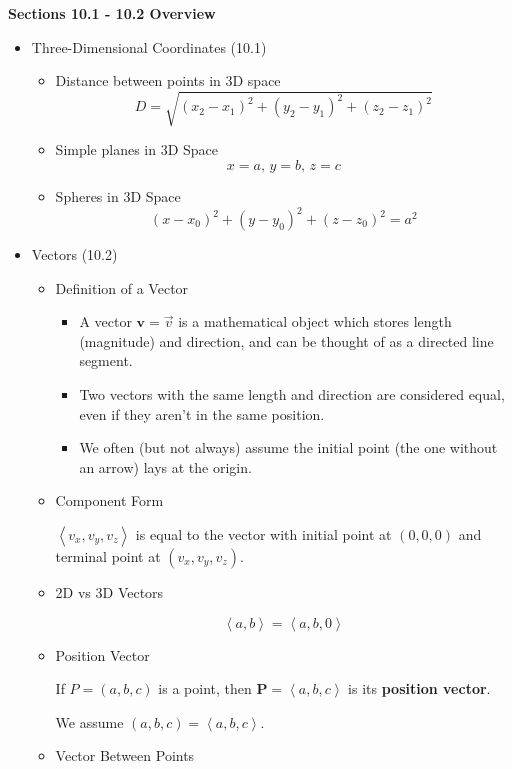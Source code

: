 \documentclass[12pt]{article}
\newcommand{\vect}[1]{\mathbf{#1}}
\newcommand{\<}{\left<}
\renewcommand{\>}{\right>}
\begin{document}
\centerline{\bf Sections 10.1 - 10.2 Overview }

\begin{itemize}
\item Three-Dimensional Coordinates (10.1)

	\begin{itemize}
	\item Distance between points in 3D space
		\[D = \sqrt{(x_2 - x_1)^2 + (y_2 - y_1)^2 + (z_2 - z_1)^2}\]
		
	\item Simple planes in 3D Space
		\[x=a,\, y=b,\, z=c\]
	
	\item Spheres in 3D Space
		\[(x-x_0)^2 + (y-y_0)^2 + (z-z_0)^2 = a^2\]
	\end{itemize}

\item Vectors (10.2)
	\begin{itemize}
	\item Definition of a Vector
	
		\begin{itemize}
		\item A vector $\vect{v}=\overrightarrow{v}$ is a mathematical object which stores length (magnitude) and direction, and can be thought of as a directed line segment.
	
		\item Two vectors with the same length and direction are considered equal, even if they aren't in the same position. 

		\item We often (but not always) assume the initial point (the one without an arrow) lays at the origin.
		\end{itemize}
		
	\item Component Form
	
		$\<v_x,v_y,v_z\>$ is equal to the vector with initial point at $(0,0,0)$ and terminal point at $(v_x,v_y,v_z)$.
		
	\item 2D vs 3D Vectors
	
		\[\<a,b\>=\<a,b,0\>\]
		
	\item Position Vector
	
		If $P=(a,b,c)$ is a point, then $\vect{P}=\<a,b,c\>$ is its \textbf{position vector}. 

		We assume $(a,b,c)=\<a,b,c\>$.

	\item Vector Between Points
	

\end{itemize}
\end{itemize}
\end{document}

